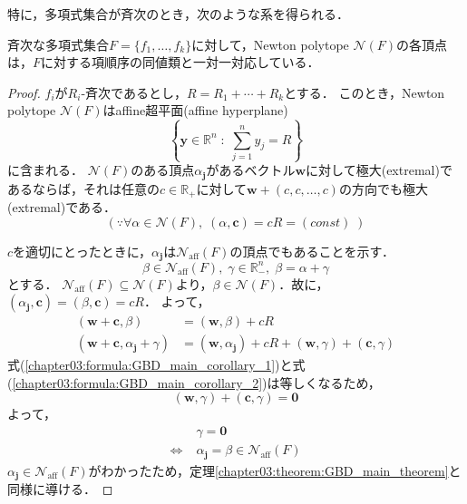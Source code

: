 特に，多項式集合が斉次のとき，次のような系を得られる．
\begin{corollary}
	\label{chapter03:corollary:GBD_main_corollary}
	斉次な多項式集合$F = \{f_1, \dots, f_k\}$に対して，Newton polytope $\mathcal{N}(F)$の各頂点は，$F$に対する項順序の同値類と一対一対応している．
\end{corollary}
\begin{proof}
	$f_i$が$R_i$-斉次であるとし，$R = R_1 + \cdots + R_k$とする．
	このとき，Newton polytope $\mathcal{N}(F)$はaffine超平面(affine hyperplane)
	$$\left\{ \bm{y} \in \mathbb{R}^n \;:\; \sum_{j=1}^n y_j = R\right\}$$
	に含まれる．
	$\mathcal{N}(F)$のある頂点$\alpha_{\bm{j}}$があるベクトル$\bm{w}$に対して極大(extremal)であるならば，それは任意の$c \in \mathbb{R}_+$に対して$\bm{w} +(c, c, \dots, c)$の方向でも極大(extremal)である．$$(\because \forall \alpha \in \mathcal{N}(F), \; (\alpha, \bm{c}) = cR = (const)\; )$$
	\par
	$c$を適切にとったときに，$\alpha_{\bm{j}}$は$\mathcal{N}_{\mathrm{aff}}(F)$の頂点でもあることを示す．
	$$\beta \in \mathcal{N}_{\mathrm{aff}}(F), \; \gamma \in \mathbb{R}^n_{-}, \; \beta = \alpha + \gamma$$とする．
	$\mathcal{N}_{\mathrm{aff}}(F) \subseteq \mathcal{N}(F)$より，$\beta \in \mathcal{N}(F)$．故に，$(\alpha_{\bm{j}}, \bm{c}) = (\beta, \bm{c}) = cR$．
	よって，
	\begin{align}
		(\bm{w} + \bm{c}, \beta) &= (\bm{w}, \beta) + cR \label{chapter03:formula:GBD_main_corollary_1}\\
		(\bm{w} + \bm{c}, \alpha_{\bm{j}}+\gamma) &= (\bm{w}, \alpha_{\bm{j}}) + cR + (\bm{w}, \gamma) + (\bm{c}, \gamma) \label{chapter03:formula:GBD_main_corollary_2}
	\end{align}
	式(\ref{chapter03:formula:GBD_main_corollary_1})と式(\ref{chapter03:formula:GBD_main_corollary_2})は等しくなるため，
	\begin{equation*}
		(\bm{w}, \gamma) + (\bm{c}, \gamma) = \bm{0}
	\end{equation*}
	よって，
	\begin{align*}
		&\gamma = \bm{0} \\
		\Longleftrightarrow \; & \alpha_{\bm{j}} = \beta \in \mathcal{N}_{\mathrm{aff}}(F)
	\end{align*}
	$\alpha_{\bm{j}} \in \mathcal{N}_{\mathrm{aff}}(F)$がわかったため，定理\ref{chapter03:theorem:GBD_main_theorem}と同様に導ける．
\end{proof}

